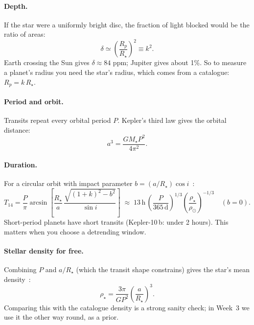 \documentclass[11pt,a4paper]{article}
\begin{document}
\paragraph{Depth.} If the star were a uniformly bright disc, the fraction of light blocked would be the ratio of areas:
\begin{equation}
  \delta \simeq \left(\frac{R_p}{R_\star}\right)^2 \equiv k^2 .
  \label{eq:depth}
\end{equation}
Earth crossing the Sun gives \(\delta \approx 84\) ppm; Jupiter gives about 1\%. So to measure a planet's radius you
need the star's radius, which comes from a catalogue: \(R_p = k\,R_\star\).

\paragraph{Period and orbit.} Transits repeat every orbital period \(P\). Kepler's third law gives the orbital distance:
\begin{equation}
  a^3 = \frac{G M_\star P^2}{4\pi^2}.
\end{equation}

\paragraph{Duration.} For a circular orbit with impact parameter \(b = (a/R_\star)\cos i\)~\citep{Winn2010}:
\begin{equation}
  T_{14} = \frac{P}{\pi}\arcsin\!\left[\frac{R_\star}{a}\,\frac{\sqrt{(1+k)^2-b^2}}{\sin i}\right]
  \;\approx\; 13\,\mathrm{h}\,\left(\frac{P}{365\,\mathrm{d}}\right)^{1/3}\left(\frac{\rho_\star}{\rho_\odot}\right)^{-1/3}
  \quad(b=0).
  \label{eq:duration}
\end{equation}
Short-period planets have short transits (Kepler-10\,b: under 2 hours). This matters when you choose a detrending window.

\paragraph{Stellar density for free.} Combining \(P\) and \(a/R_\star\) (which the transit shape constrains) gives the
star's mean density~\citep{SeagerMallenOrnelas2003}:
\begin{equation}
  \rho_\star = \frac{3\pi}{G P^2}\left(\frac{a}{R_\star}\right)^3 .
  \label{eq:rho}
\end{equation}
Comparing this with the catalogue density is a strong sanity check; in Week~3 we use it the other way round, as a prior.
\end{document}
